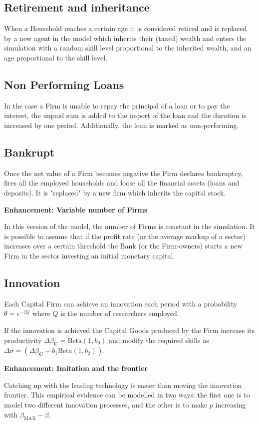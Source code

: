 \documentclass[a4paper, headings=standardclasses]{scrartcl}
\newenvironment{enh}[1][]{\begin{framed}\noindent\textbf{Enhancement: #1}\par}{\end{framed}}
\begin{document}
\subsection{Retirement and inheritance}
When a Household reaches a certain age it is considered retired and is replaced by a new agent in the model which inherits their (taxed) wealth and enters the simulation with a random skill level proportional to the inherited wealth, and an age proportional to the skill level.

\subsection{Non Performing Loans}
In the case a Firm is unable to repay the principal of a loan or to pay the interest, the unpaid sum is added to the import of the loan and the duration is increased by one period. Additionally, the loan is marked as non-performing.

\subsection{Bankrupt}
Once the net value of a Firm becomes negative the Firm declares bankruptcy, fires all the employed households and loose all the financial assets (loans and deposits). It is "replaced" by a new firm which inherits the capital stock.

\begin{enh}[Variable number of Firms]
    In this version of the model, the number of Firms is constant in the simulation. It is possible to assume that if the profit rate (or the average markup of a sector) increases over a certain threshold the Bank (or the Firm-owners) starts a new Firm in the sector investing an initial monetary capital.
\end{enh}

\subsection{Innovation}
Each Capital Firm can achieve an innovation each period with a probability $\theta = e^{-\zeta Q}$ where $Q$ is the number of researchers employed.

If the innovation is achieved the Capital Goods produced by the Firm increase its productivity $\Delta \beta_\mathbf{C} = \text{Beta}(1, b_0)$ and modify the required skills as $\Delta \sigma = (\Delta \beta_\mathbf{C} - b_1 \text{Beta}(1, b_2))$.

\begin{enh}[Imitation and the frontier]
    Catching up with the leading technology is easier than moving the innovation frontier. This empirical evidence can be modelled in two ways: the first one is to model two different innovation processes, and the other is to make $p$ increasing with $\beta_\text{MAX} - \beta$.
\end{enh}
\end{document}
